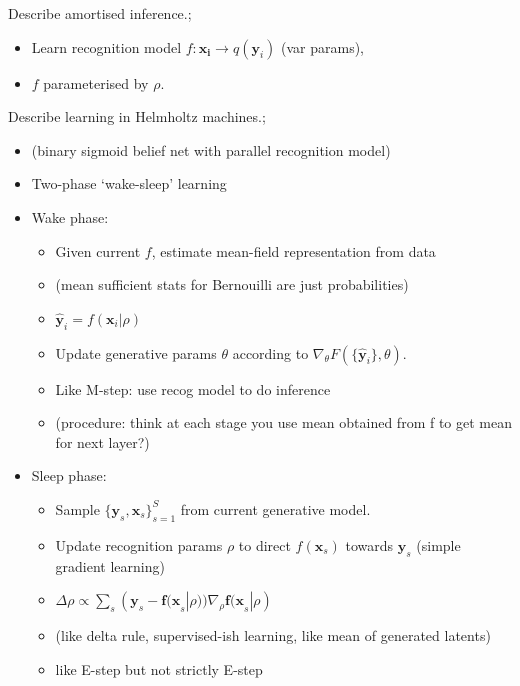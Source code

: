 \documentclass{article}
\begin{document}
Describe amortised inference.; \begin{itemize}
    \item Learn recognition model $f:\bm{x_i}\rightarrow q(\bm{y}_i)$ (var params),
    \item $f$ parameterised by $\rho$.
\end{itemize}

Describe learning in Helmholtz machines.; \begin{itemize}
    \item (binary sigmoid belief net with parallel recognition model)
    \item Two-phase `wake-sleep' learning
    \item Wake phase: \begin{itemize}
        \item Given current $f$, estimate mean-field representation from data 
        \item (mean sufficient stats for Bernouilli are just probabilities)
        \item $\bm{\hat{y}}_i = f(\bm{x}_i|\rho)$
        \item Update generative params $\theta$ according to $\nabla_{\theta} F(\{\hat{\bm{y}}_i\}, \theta)$.
        \item Like M-step: use recog model to do inference
        \item (procedure: think at each stage you use mean obtained from f to get mean for next layer?)
    \end{itemize}
    \item Sleep phase: \begin{itemize}
        \item Sample $\{\bm{y}_s, \bm{x}_s\}_{s=1}^S$ from current generative model.
        \item Update recognition params $\rho$ to direct $f(\bm{x}_s)$ towards $\bm{y}_s$ (simple gradient learning)
        \item $\Delta \rho \propto \sum_s (\bm{y}_s - \bm{f(x}_s | \rho))\nabla_\rho \bm{f(x}_s|\rho)$
        \item (like delta rule, supervised-ish learning, like mean of generated latents)
        \item like E-step but not strictly E-step
    \end{itemize}
\end{itemize}
\end{document}
